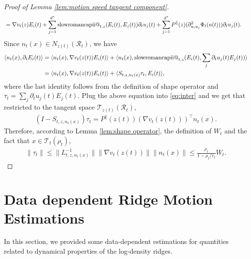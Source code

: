 \documentclass[11pt]{article}
\makeatletter
\newcommand*{\rom}[1]{\expandafter\@slowromancap\romannumeral #1@}
\newcommand{\mc}{\mathcal}
\makeatother
\begin{document}
\begin{proof}[Proof of Lemma \ref{lem:motion speed tangent component}]
\begin{align*}
    & = \nabla v_t(z) E_i(t) + \sum_{j=1}^{d^*} \text{\rom{2}}_{t,z}(E_i(t),E_j(t))\partial_t u_j(t) + \sum_{j=1}^{d^*} P^\parallel(z)(\partial^2_{u_i u_j}\Phi_t(u(t)))\partial_t u_j(t).
\end{align*}
Since $n_t(x)\in N_{z(t)}(\mc{R}_t)$, we have
\begin{align*}
    \langle n_t(x), \partial_t E_i(t) \rangle & = \langle n_t(x), \nabla v_t(z(t)) E_i(t) \rangle + \langle n_t(x),  \text{\rom{2}}_{t,z}(E_i(t),\sum_j \partial_t u_j(t)E_j(t)) \rangle \\
    & = \langle n_t(x), \nabla v_t(z(t)) E_i(t) \rangle +\langle S_{t,z,n_t(x)} \tau_t, E_i(t) \rangle,
\end{align*}
where the last identity follows from the definition of shape operator and $\tau_t=\sum_j \partial_t u_j(t)E_j(t)$. Plug the above equation into \eqref{eq:inter} and we get that restricted to the tangent space $\mc{T}_{z(t)}(\mc{R}_t)$,
\begin{align*}
    (I-S_{t,z,n_t(x)} )\tau_t = P^\parallel(z(t))(\nabla v_t(z(t)))^\intercal n_t(x).
\end{align*}
Therefore, according to Lemma \ref{lem:shape operator}, the definition of $W_t$ and the fact that $x\in \mc{T}_t(\rho_t)$,
\begin{align*}
    \| \tau_t \| \le \| L_{t,z,n_t(x)}^{-1} \| \| \nabla v_t(z(t)) \| \| n_t(x) \| \le \frac{\rho_t}{1-\rho_t/r_t} W_t.
\end{align*}
\end{proof}


\section{Data dependent Ridge Motion Estimations}\label{append:data dependent motion estimation}

In this section, we provided some data-dependent estimations for quantities related to dynamical properties of the log-density ridges.
\end{document}
